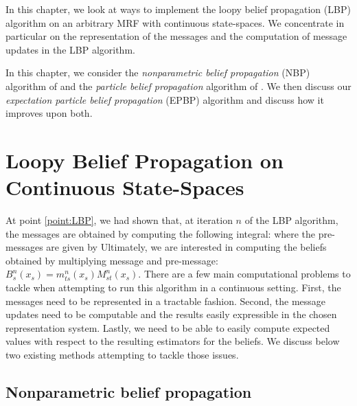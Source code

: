 
In this chapter, we look at ways to implement the loopy belief propagation (LBP) algorithm on an arbitrary MRF with continuous state-spaces. We concentrate in particular on the representation of the messages and the computation of message updates in the LBP algorithm. 

In this chapter, we consider the \emph{nonparametric belief propagation} (NBP) algorithm of \citet{sudderth03} and the \emph{particle belief propagation} algorithm of \citet{ihler09}. We then discuss our \emph{expectation particle belief propagation} (EPBP) algorithm \citep{lienart15} and discuss how it improves upon both. 

\section{Loopy Belief Propagation on Continuous State-Spaces}
At point \ref{point:LBP}, we had shown that, at iteration $n$ of the LBP algorithm, the messages are obtained by computing the following integral:
where the pre-messages are given by 
Ultimately, we are interested in computing the beliefs obtained by multiplying message and pre-message: $B_{s}^{n}(x_{s}) = m^{n}_{ts}(x_{s})M^{n}_{st}(x_{s})$. There are a few main computational problems to tackle when attempting to run this algorithm in a continuous setting. First, the messages need to be represented in a tractable fashion. Second, the message updates need to be computable and the results easily expressible in the chosen representation system. Lastly, we need to be able to easily compute expected values with respect to the resulting estimators for the beliefs. We discuss below two existing methods attempting to tackle those issues.
\subsection{Nonparametric belief propagation}


